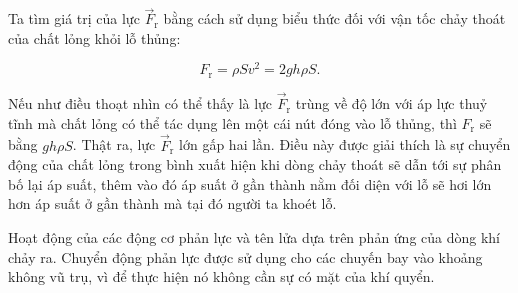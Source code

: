 
Ta tìm giá trị của lực $\vec{F}_{\text{r}}$ bằng cách sử dụng biểu thức  đối với vận tốc chảy thoát của chất lỏng khỏi lỗ thủng:

\begin{equation}\label{eq:9_8}
	F_{\text{r}} = \rho Sv^2 = 2gh\rho S.
\end{equation}
\noindent


Nếu như điều thoạt nhìn có thể thấy là lực $\vec{F}_{\text{r}}$ trùng về độ lớn với áp lực thuỷ tĩnh mà chất lỏng có thể tác dụng lên một cái nút đóng vào lỗ thủng, thì $F_{\text{r}}$ sẽ bằng $gh\rho S$. Thật ra, lực $\vec{F}_{\text{r}}$ lớn gấp hai lần. Điều này được giải thích là sự chuyển động của chất lỏng trong bình xuất hiện khi dòng chảy thoát sẽ dẫn tới sự phân bố lại áp suất, thêm vào đó áp suất ở gần thành nằm đối diện với lỗ sẽ hơi lớn hơn áp suất ở gần thành mà tại đó người ta khoét lỗ.


Hoạt động của các động cơ phản lực và tên lửa dựa trên phản ứng của dòng khí chảy ra. Chuyển động phản lực được sử dụng cho các chuyến bay vào khoảng không vũ trụ, vì để thực hiện nó không cần sự có mặt của khí quyển.



